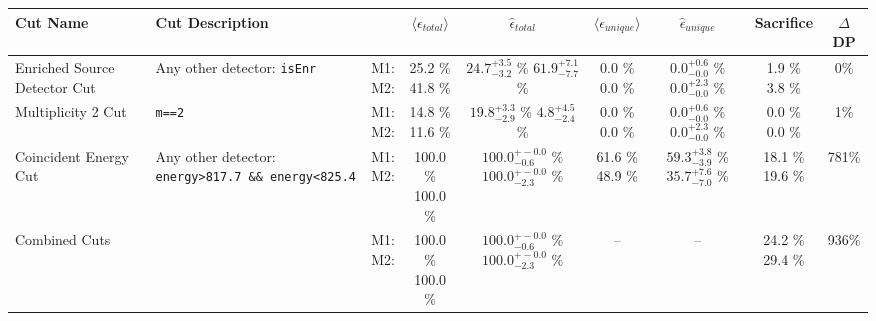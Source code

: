 \small
\begin{tabular}{|>{\raggedright}m{3cm}|m{6cm}|c c c|c c|c|c|}
\hline
  Cut Name & Cut Description &   & $\langle\epsilon_{total}\rangle$ & $\hat{\epsilon}_{total}$ & $\langle\epsilon_{unique}\rangle$ & $\hat{\epsilon}_{unique}$ & Sacrifice & $\Delta$DP \\
\hline
  Enriched Source Detector Cut & \tiny Any other detector: \texttt{isEnr} & \makecell{M1: \\ M2:} & \makecell{25.2 \% \\ 41.8 \%} & \makecell{$24.7^{+3.5}_{-3.2}$ \% \\ $61.9^{+7.1}_{-7.7}$ \%} & \makecell{0.0 \% \\ 0.0 \%} & \makecell{$0.0^{+0.6}_{-0.0}$ \% \\ $0.0^{+2.3}_{-0.0}$ \%} & \makecell{1.9 \% \\ 3.8 \%} & 0\% \\
  Multiplicity 2 Cut & \tiny  \texttt{m==2} & \makecell{M1: \\ M2:} & \makecell{14.8 \% \\ 11.6 \%} & \makecell{$19.8^{+3.3}_{-2.9}$ \% \\ $4.8^{+4.5}_{-2.4}$ \%} & \makecell{0.0 \% \\ 0.0 \%} & \makecell{$0.0^{+0.6}_{-0.0}$ \% \\ $0.0^{+2.3}_{-0.0}$ \%} & \makecell{0.0 \% \\ 0.0 \%} & 1\% \\
  Coincident Energy Cut & \tiny Any other detector: \texttt{energy>817.7 \&\& energy<825.4} & \makecell{M1: \\ M2:} & \makecell{100.0 \% \\ 100.0 \%} & \makecell{$100.0^{+-0.0}_{-0.6}$ \% \\ $100.0^{+-0.0}_{-2.3}$ \%} & \makecell{61.6 \% \\ 48.9 \%} & \makecell{$59.3^{+3.8}_{-3.9}$ \% \\ $35.7^{+7.6}_{-7.0}$ \%} & \makecell{18.1 \% \\ 19.6 \%} & 781\% \\
  Combined Cuts &  & \makecell{M1: \\ M2:} & \makecell{100.0 \% \\ 100.0 \%} & \makecell{$100.0^{+-0.0}_{-0.6}$ \% \\ $100.0^{+-0.0}_{-2.3}$ \%} & -- & -- & \makecell{24.2 \% \\ 29.4 \%} & 936\% \\
\hline
\end{tabular}
